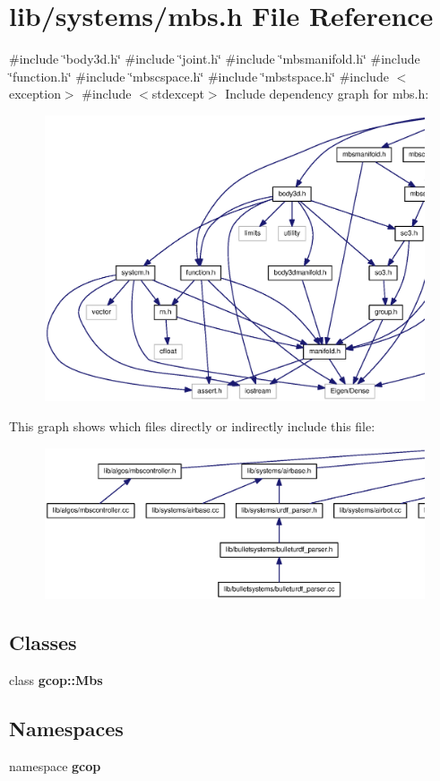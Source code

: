 \section{lib/systems/mbs.h \-File \-Reference}
\label{mbs_8h}
{\ttfamily \#include \char`\"{}body3d.\-h\char`\"{}}\*
{\ttfamily \#include \char`\"{}joint.\-h\char`\"{}}\*
{\ttfamily \#include \char`\"{}mbsmanifold.\-h\char`\"{}}\*
{\ttfamily \#include \char`\"{}function.\-h\char`\"{}}\*
{\ttfamily \#include \char`\"{}mbscspace.\-h\char`\"{}}\*
{\ttfamily \#include \char`\"{}mbstspace.\-h\char`\"{}}\*
{\ttfamily \#include $<$exception$>$}\*
{\ttfamily \#include $<$stdexcept$>$}\*
\-Include dependency graph for mbs.\-h\-:
\nopagebreak
\begin{figure}[H]
\begin{center}
\leavevmode
\includegraphics[width=350pt]{mbs_8h__incl}
\end{center}
\end{figure}
\-This graph shows which files directly or indirectly include this file\-:
\nopagebreak
\begin{figure}[H]
\begin{center}
\leavevmode
\includegraphics[width=350pt]{mbs_8h__dep__incl}
\end{center}
\end{figure}
\subsection*{\-Classes}
\begin{DoxyCompactItemize}
\item 
class {\bf gcop\-::\-Mbs}
\end{DoxyCompactItemize}
\subsection*{\-Namespaces}
\begin{DoxyCompactItemize}
\item 
namespace {\bf gcop}
\end{DoxyCompactItemize}
